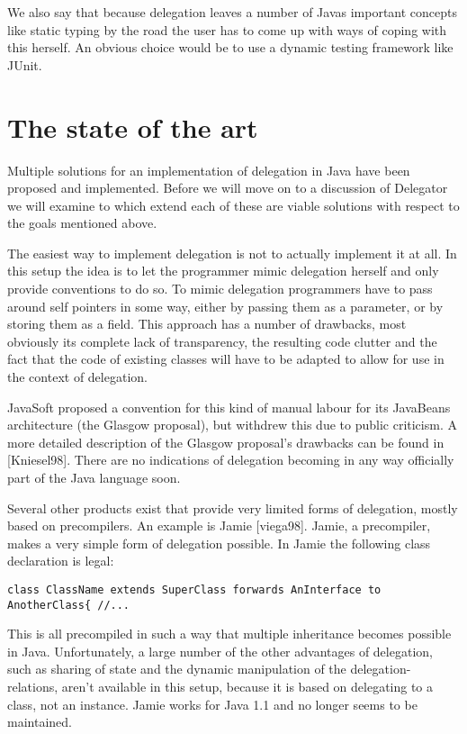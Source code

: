 \documentclass[a4paper,12pt]{book}
\begin{document}
We also say that because delegation leaves a number of Javas important concepts like static typing by the road the user has to come up with ways of coping with this herself. An obvious choice would be to use a dynamic testing framework like JUnit.

\section*{The state of the art}
Multiple solutions for an implementation of delegation in Java have been proposed and implemented. Before we will move on to a discussion of Delegator we will examine to which extend each of these are viable solutions with respect to the goals mentioned above.

The easiest way to implement delegation is not to actually implement it at all. In this setup the idea is to let the programmer mimic delegation herself and only provide conventions to do so. To mimic delegation programmers have to pass around self pointers in some way, either by passing them as a parameter, or by storing them as a field. This approach has a number of drawbacks, most obviously its complete lack of transparency, the resulting code clutter and the fact that the code of existing classes will have to be adapted to allow for use in the context of delegation.

JavaSoft proposed a convention for this kind of manual labour for its JavaBeans architecture (the Glasgow proposal), but withdrew this due to public criticism. A more detailed description of the Glasgow proposal's drawbacks can be found in [Kniesel98]. There are no indications of delegation becoming in any way officially part of the Java language soon.

Several other products exist that provide very limited forms of delegation, mostly based on precompilers. An example is Jamie [viega98]. Jamie, a precompiler, makes a very simple form of delegation possible. In Jamie the following class declaration is legal:

\begin{verbatim}
class ClassName extends SuperClass forwards AnInterface to AnotherClass{ //...
\end{verbatim}

This is all precompiled in such a way that multiple inheritance becomes possible in Java. Unfortunately, a large number of the other advantages of delegation, such as sharing of state and the dynamic manipulation of the delegation-relations, aren't available in this setup, because it is based on delegating to a class, not an instance. Jamie works for Java 1.1 and no longer seems to be maintained.
\end{document}
